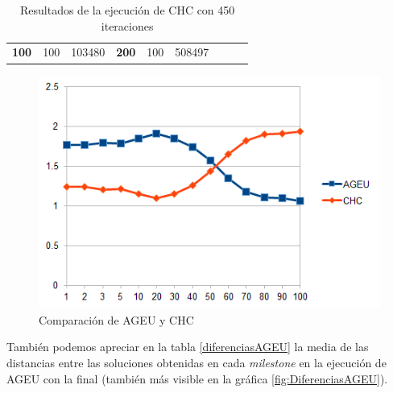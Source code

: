 \begin{table}[]
\begin{tabular}{|cclccllll}
\multicolumn{1}{|c|}{\multirow{-39}{*}{\cellcolor[HTML]{FFFFC7}\textbf{100}}} & \multicolumn{1}{c|}{\multirow{-9}{*}{\cellcolor[HTML]{DDFDFF}100}} & \multicolumn{1}{l|}{\cellcolor[HTML]{DAE8FC}103480}    & \multicolumn{1}{c|}{\multirow{-39}{*}{\cellcolor[HTML]{FFFFC7}\textbf{200}}} & \multicolumn{1}{c|}{\multirow{-10}{*}{\cellcolor[HTML]{DDFDFF}100}} & \multicolumn{1}{l|}{\cellcolor[HTML]{DDFDFF}508497}    &                                                                              &                                                                    &                                                        \\ \cline{1-6}
\end{tabular}
\caption{\label{CHC450}Resultados de la ejecución de CHC con 450 iteraciones}
\end{table}

\begin{figure}
		\centering
		\includegraphics[scale=0.8]{imagenes/Experimental/AGEUvsCHC.png}
        \caption{Comparación de AGEU y CHC}
        \label{fig:AGEUvsCHC}
\end{figure}

También podemos apreciar en la tabla \ref{diferenciasAGEU} la media de las distancias entre las soluciones obtenidas en cada \textit{milestone} en la ejecución de AGEU con la final (también más visible en la gráfica \ref{fig:DiferenciasAGEU}). 

